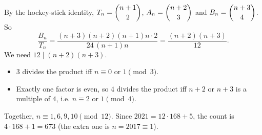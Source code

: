 By the hockey-stick identity, $T_n=\dbinom{n+1}{2}$, $A_n=\dbinom{n+2}{3}$ and $B_n=\dbinom{n+3}{4}$. So
\[\dfrac{B_n}{T_n}=\dfrac{(n+3)(n+2)(n+1)n\cdot2}{24\,(n+1)n}=\dfrac{(n+2)(n+3)}{12}.\]
We need $12\mid(n+2)(n+3)$.
\begin{itemize}
\item $3$ divides the product iff $n\equiv0$ or $1\pmod3$.
\item Exactly one factor is even, so $4$ divides the product iff $n+2$ or $n+3$ is a multiple of $4$, i.e. $n\equiv2$ or $1\pmod4$.
\end{itemize}
Together, $n\equiv1,6,9,10\pmod{12}$. Since $2021=12\cdot168+5$, the count is $4\cdot168+1=\boxed{673}$ (the extra one is $n=2017\equiv1$).
